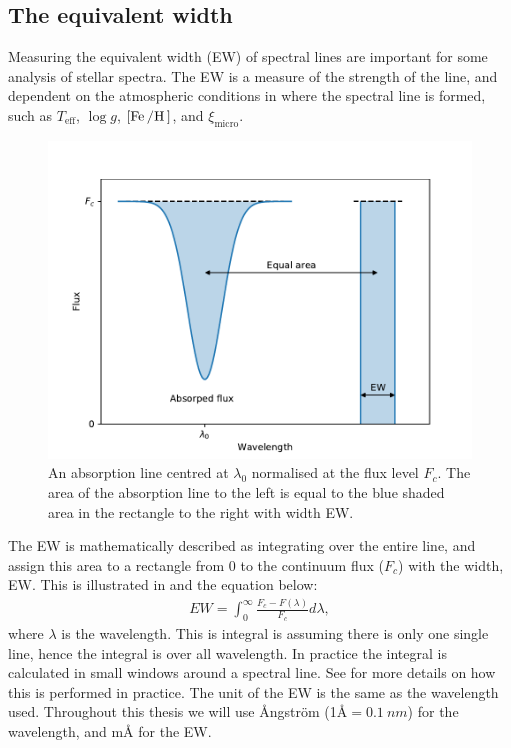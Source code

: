 \subsection{The equivalent width}
\label{sec:EW}

Measuring the equivalent width (EW) of spectral lines are important for some
analysis of stellar spectra. The EW is a measure of the strength of the line,
and dependent on the atmospheric conditions in where the spectral line is
formed, such as $T_\mathrm{eff}$, $\log g$, $[\ion{Fe}/\ion{H}]$, and
$\xi_\mathrm{micro}$.

\begin{figure}[htpb!]
    \centering
    \includegraphics[width=1.0\linewidth]{figures/ewTheoretical.pdf}
    \caption{An absorption line centred at $\lambda_0$ normalised at the flux
             level $F_c$. The area of the absorption line to the left is equal
             to the blue shaded area in the rectangle to the right with width
             EW.}
    \label{fig:ewTheoretical}
\end{figure}

The EW is mathematically described as integrating over the entire line, and
assign this area to a rectangle from 0 to the continuum flux ($F_c$) with the
width, EW. This is illustrated in  and the equation
below: \begin{align} EW = \int_{0}^{\infty} \frac{F_c-F(\lambda)}{F_c} d\lambda,
\end{align} where $\lambda$ is the wavelength. This is integral is assuming
there is only one single line, hence the integral is over all wavelength. In
practice the integral is calculated in small windows around a spectral line. See
 for more details on how this is performed in practice. The
unit of the EW is the same as the wavelength used. Throughout this thesis we
will use \AA{}ngstr\"{o}m (1\AA$=\SI{0.1}{nm}$) for the wavelength, and m\AA{}
for the EW.


